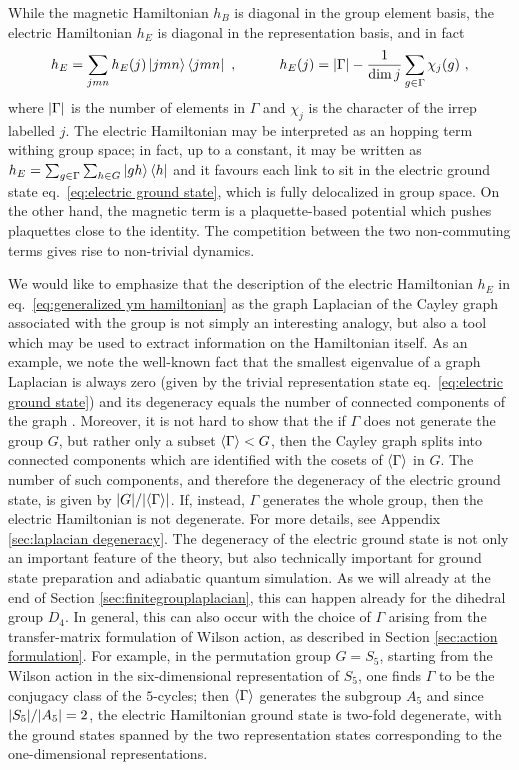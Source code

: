 While the magnetic Hamiltonian $h_B$ is diagonal in the group element basis, the electric Hamiltonian $h_E$ is diagonal in the representation basis, and in fact
\begin{equation}
    \label{eq:electric hamiltonian rep basis}
    h_E = \sum_{jmn} h_E(j) \ket{jmn}\bra{jmn} \ , \quad \quad \quad h_E(j)=\abs{\Gamma} - \frac{1}{\dim{j}} \sum_{g \in \Gamma} \chi_j(g)\ ,
\end{equation}
where $\abs{\Gamma}$ is the number of elements in $\Gamma$ and $\chi_j$ is the character of the irrep labelled $j$.
The electric Hamiltonian may be interpreted as an  hopping term withing group space; in fact, up to a constant, it may be written as $h_E = \sum_{g \in \Gamma} \sum_{h \in G} \ket{gh}\bra{h}$ and it favours each link to sit in the electric ground state eq.~\eqref{eq:electric ground state}, which is fully delocalized in group space.
On the other hand, the magnetic term is a plaquette-based potential which pushes plaquettes close to the identity.
The competition between the two non-commuting terms gives rise to non-trivial dynamics.

We would like to emphasize that the description of the electric Hamiltonian $h_E$ in eq.~\eqref{eq:generalized ym hamiltonian} as the graph Laplacian of the Cayley graph associated with the group is not simply an interesting analogy, but also a tool which may be used to extract information on the Hamiltonian itself.
As an example, we note the well-known fact that the smallest eigenvalue of a graph Laplacian is always zero (given by the trivial representation state eq.~\eqref{eq:electric ground state}) and its degeneracy equals the number of connected components of the graph \cite{spectralgraphtheory}.
Moreover, it is not hard to show that the if $\Gamma$ does not generate the group $G$, but rather only a subset $\expval{\Gamma} < G$, then the Cayley graph splits into connected components which are identified with the cosets of $\expval{\Gamma}$ in $G$.
The number of such components, and therefore the degeneracy of the electric ground state, is given by $\abs{G}/\abs{\expval{\Gamma}}$.
If, instead, $\Gamma$ generates the whole group, then the electric Hamiltonian is not degenerate.
For more details, see Appendix \ref{sec:laplacian degeneracy}.
The degeneracy of the electric ground state is not only an important feature of the theory, but also technically important for ground state preparation and adiabatic quantum simulation.
As we will already at the end of Section \ref{sec:finitegrouplaplacian}, this can happen already for the dihedral group $D_4$.
In general, this can also occur with the choice of $\Gamma$ arising from the transfer-matrix formulation of Wilson action, as described in Section \ref{sec:action formulation}.
For example, in the permutation group $G=S_5$, starting from the Wilson action in the six-dimensional representation of $S_5$, one finds $\Gamma$ to be the conjugacy class of the $5$-cycles; then $\expval{\Gamma}$ generates the subgroup $A_5$ and since $\abs{S_5}/\abs{A_5}=2$, the electric Hamiltonian ground state is two-fold degenerate, with the ground states spanned by the two representation states corresponding to the one-dimensional representations.


